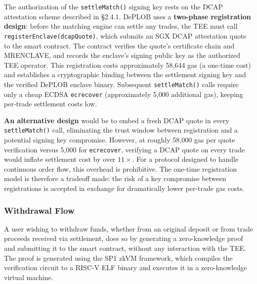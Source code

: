 \documentclass[12pt,a4paper]{article}
\begin{document}
The authorization of the \texttt{settleMatch()} signing key rests on the DCAP attestation scheme described in \S2.4.1. DePLOB uses a \textbf{two-phase registration design}: before the matching engine can settle any trades, the TEE must call \texttt{registerEnclave(dcapQuote)}, which submits an SGX DCAP attestation quote to the smart contract. The contract verifies the quote's certificate chain and MRENCLAVE, and records the enclave's signing public key as the authorized TEE operator. This registration costs approximately 58{,}644 gas (a one-time cost) and establishes a cryptographic binding between the settlement signing key and the verified DePLOB enclave binary. Subsequent \texttt{settleMatch()} calls require only a cheap ECDSA \texttt{ecrecover} (approximately 5{,}000 additional gas), keeping per-trade settlement costs low.

\textbf{An alternative design} would be to embed a fresh DCAP quote in every \texttt{settleMatch()} call, eliminating the trust window between registration and a potential signing key compromise. However, at roughly 58{,}000 gas per quote verification versus 5{,}000 for \texttt{ecrecover}, verifying a DCAP quote on every trade would inflate settlement cost by over $11\times$. For a protocol designed to handle continuous order flow, this overhead is prohibitive. The one-time registration model is therefore a tradeoff made: the risk of a key compromise between registrations is accepted in exchange for dramatically lower per-trade gas costs.

\subsubsection{Withdrawal Flow}

A user wishing to withdraw funds, whether from an original deposit or from trade proceeds received via settlement, does so by generating a zero-knowledge proof and submitting it to the smart contract, without any interaction with the TEE. The proof is generated using the SP1 zkVM framework, which compiles the verification circuit to a RISC-V ELF binary and executes it in a zero-knowledge virtual machine.
\end{document}
